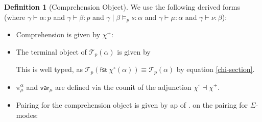 \documentclass[10pt]{article}
\theoremstyle{definition}
\newtheorem{definition}{Definition}
\newcommand\dsd[1]{\ensuremath{\mathsf{#1}}}
\newcommand{\yields}{\vdash}
\newcommand\TermTwoT[5]{\ensuremath{#1 \mid #3 \vDash_{#5} #2 : #4}}
\newcommand\TrPlus[2]{\ensuremath{{#1}^+(#2)}}
\newcommand\TrCirc[2]{\ensuremath{{#1}^\circ(#2)}}
\newcommand\var[1]{\ensuremath{\mathsf{var}_{#1}}}
\newcommand\El[2]{\mathcal{T}_{#1}(#2)}
\newcommand\ApEl[2]{\mathcal{T}_{#1}\langle#2\rangle}
\newcommand\ap[2]{\ensuremath{#1 \langle #2 \rangle }}
\newcommand{\app}[2]{\ensuremath{#1 \: #2}}
\newcommand{\sigmacl}[3]{\ensuremath{\textnormal{$\Sigma$}\,#1{:}#2.\,#3}}
\newcommand{\fst}[1]{\app{\dsd{fst}}{#1}}
\newcommand{\snd}[1]{\app{\dsd{snd}}{#1}}
\newcommand\bdot[0]{\mathbin{.}}
\begin{document}
\begin{definition}[Comprehension Object]
\noindent We use the following derived forms
(where $\gamma \yields \alpha : p$ and $\gamma \yields \beta : p$ and  $\TermTwoT{\gamma}{s}{\beta}{\alpha}{p}$ and $\gamma \yields \mu : \alpha$ and $\gamma \yields \nu : \beta$):
  \begin{itemize}
  \item Comprehension is given by $\chi^+$:
  \item The terminal object of $\El{p}{\alpha}$ is given by 
  This is well typed, as $\El{p}{\fst{\TrCirc{\chi}{\alpha}}} \equiv \El{p}{\alpha}$ by equation \eqref{chi-section}.
  \item $\pi^\alpha_\mu$ and $\var{\mu}$ are defined via the counit of the adjunction $\chi^\circ \dashv \chi^+$.
  \item Pairing for the comprehension object is given by ap of
  $.$ on the pairing for $\Sigma$-modes:
  \end{itemize}
\end{definition}
\end{document}
